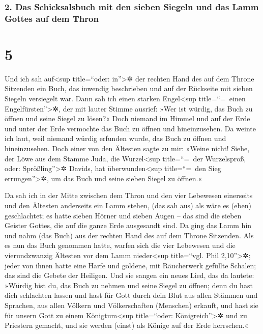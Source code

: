 \hypertarget{das-schicksalsbuch-mit-den-sieben-siegeln-und-das-lamm-gottes-auf-dem-thron}{%
\subsubsection{2. Das Schicksalsbuch mit den sieben Siegeln und das Lamm
Gottes auf dem
Thron}\label{das-schicksalsbuch-mit-den-sieben-siegeln-und-das-lamm-gottes-auf-dem-thron}}

\hypertarget{section-4}{%
\section{5}\label{section-4}}

 Und ich sah auf\textless sup title=``oder:
in''\textgreater✲ der rechten Hand des auf dem Throne Sitzenden ein
Buch, das inwendig beschrieben und auf der Rückseite mit sieben Siegeln
versiegelt war.  Dann sah ich einen starken
Engel\textless sup title=``=~einen Engelfürsten''\textgreater✲, der mit
lauter Stimme ausrief: »Wer ist würdig, das Buch zu öffnen und seine
Siegel zu lösen?«  Doch niemand im Himmel und auf der Erde
und unter der Erde vermochte das Buch zu öffnen und hineinzusehen.
 Da weinte ich laut, weil niemand würdig erfunden wurde,
das Buch zu öffnen und hineinzusehen.  Doch einer von den
Ältesten sagte zu mir: »Weine nicht! Siehe, der Löwe aus dem Stamme
Juda, die Wurzel\textless sup title=``=~der Wurzelsproß, oder:
Sprößling''\textgreater✲ Davids, hat überwunden\textless sup
title=``=~den Sieg errungen''\textgreater✲, um das Buch und seine sieben
Siegel zu öffnen.«

 Da sah ich in der Mitte zwischen dem Thron und den vier
Lebewesen einerseits und den Ältesten anderseits ein Lamm stehen, (das
sah aus) als wäre es (eben) geschlachtet; es hatte sieben Hörner und
sieben Augen -- das sind die sieben Geister Gottes, die auf die ganze
Erde ausgesandt sind.  Da ging das Lamm hin und nahm (das
Buch) aus der rechten Hand des auf dem Throne Sitzenden. 
Als es nun das Buch genommen hatte, warfen sich die vier Lebewesen und
die vierundzwanzig Ältesten vor dem Lamm nieder\textless sup
title=``vgl. Phil 2,10''\textgreater✲; jeder von ihnen hatte eine Harfe
und goldene, mit Räucherwerk gefüllte Schalen; das sind die Gebete der
Heiligen.  Und sie sangen ein neues Lied, das da lautete:
»Würdig bist du, das Buch zu nehmen und seine Siegel zu öffnen; denn du
hast dich schlachten lassen und hast für Gott durch dein Blut aus allen
Stämmen und Sprachen, aus allen Völkern und Völkerschaften (Menschen)
erkauft,  und hast sie für unsern Gott zu einem
Königtum\textless sup title=``oder: Königreich''\textgreater✲ und zu
Priestern gemacht, und sie werden (einst) als Könige auf der Erde
herrschen.«

